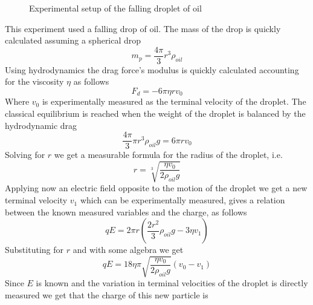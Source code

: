 \documentclass[../qm.tex]{subfiles}
\begin{document}
\begin{figure}[H]
	\centering
	\caption{Experimental setup of the falling droplet of oil}
	\label{fig:dropmilliken}
\end{figure}
This experiment used a falling drop of oil. The mass of the drop is quickly calculated assuming a spherical drop
\begin{equation*}
	m_p=\frac{4\pi}{3}r^3\rho_{oil}
\end{equation*}
Using hydrodynamics the drag force's modulus is quickly calculated accounting for the viscosity $\eta$ as follows
\begin{equation*}
	F_d=-6\pi\eta rv_0
\end{equation*}
Where $v_0$ is experimentally measured as the terminal velocity of the droplet. The classical equilibrium is reached when the weight of the droplet is balanced by the hydrodynamic drag
\begin{equation*}
	\frac{4\pi}{3}\pi r^3\rho_{oil}g=6\pi rv_0
\end{equation*}
Solving for $r$ we get a measurable formula for the radius of the droplet, i.e.
\begin{equation}
	r=\sqrt[3]{\frac{\eta v_0}{2\rho_{oil}g}}
	\label{eq:dynradoil}
\end{equation}
Applying now an electric field opposite to the motion of the droplet we get a new terminal velocity $v_1$ which can be experimentally measured, gives a relation between the known measured variables and the charge, as follows
\begin{equation*}
	qE=2\pi r\left( \frac{2r^2}{3}\rho_{oil} g-3\eta v_1 \right)
\end{equation*}
Substituting for $r$ and with some algebra we get
\begin{equation*}
	qE=18\eta\pi\sqrt{\frac{\eta v_0}{2\rho_{oil}g}}\left( v_0-v_1 \right)
\end{equation*}
Since $E$ is known and the variation in terminal velocities of the droplet is directly measured we get that the charge of this new particle is
\end{document}
